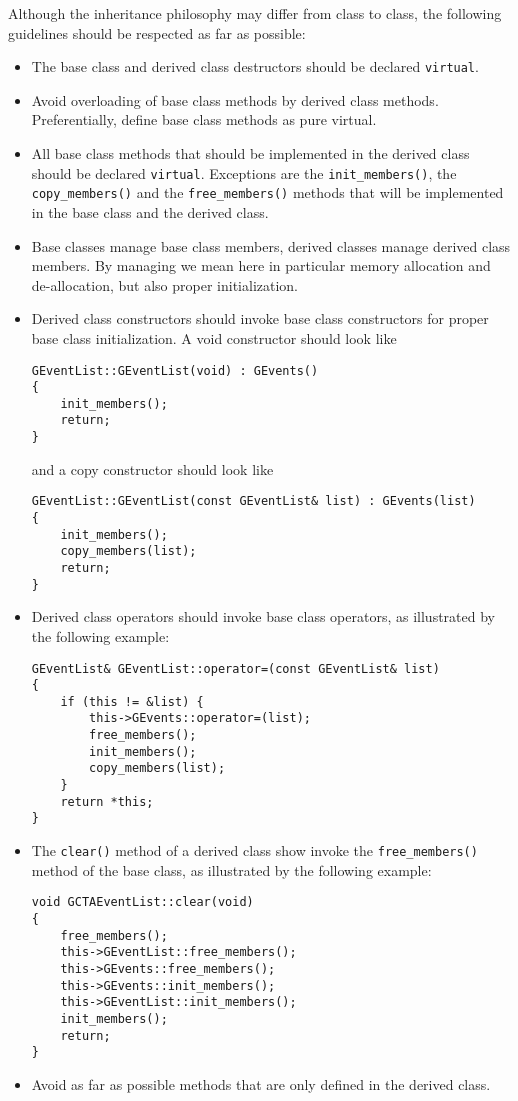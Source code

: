\documentclass{article}[12pt,a4]
\begin{document}
Although the inheritance philosophy may differ from class to class, the following guidelines
should be respected as far as possible:
\begin{itemize}
\item The base class and derived class destructors should be declared {\tt virtual}.
\item Avoid overloading of base class methods by derived class methods. 
Preferentially, define base class methods as pure virtual.
\item All base class methods that should be implemented in the derived class should
be declared {\tt virtual}.
Exceptions are the {\tt init\_members()}, the {\tt copy\_members()} and the {\tt free\_members()}
methods that will be implemented in the base class and the derived class.
\item Base classes manage base class members, derived classes manage derived class
members. 
By managing we mean here in particular memory allocation and de-allocation,
but also proper initialization.
\item Derived class constructors should invoke base class constructors for proper
base class initialization. A void constructor should look like
\begin{verbatim}
GEventList::GEventList(void) : GEvents()
{
    init_members();
    return;
}
\end{verbatim}
and a copy constructor should look like
\begin{verbatim}
GEventList::GEventList(const GEventList& list) : GEvents(list)
{
    init_members();
    copy_members(list);
    return;
}
\end{verbatim}
\item Derived class operators should invoke base class operators, as illustrated
by the following example:
\begin{verbatim}
GEventList& GEventList::operator=(const GEventList& list)
{
    if (this != &list) {
        this->GEvents::operator=(list);
        free_members();
        init_members();
        copy_members(list);
    }
    return *this;
}
\end{verbatim}
\item The {\tt clear()} method of a derived class show invoke the {\tt free\_members()} method
of the base class, as illustrated by the following example:
\begin{verbatim}
void GCTAEventList::clear(void)
{
    free_members();
    this->GEventList::free_members();
    this->GEvents::free_members();
    this->GEvents::init_members();
    this->GEventList::init_members();
    init_members();
    return;
}
\end{verbatim}
\item Avoid as far as possible methods that are only defined in the derived class.
\end{itemize}
\end{document}
